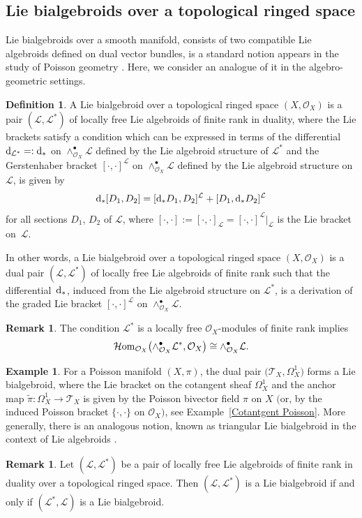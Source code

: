 \documentclass[pdftex]{sigma}
\numberwithin{equation}{section}
\theoremstyle{definition}
\newtheorem{Def}[Thm]{Definition}
\newtheorem{Exm}[Thm]{Example}
\newtheorem{Rem}[Thm]{Remark}
\begin{document}
\subsection{Lie bialgebroids over a topological ringed space} \label{Lie bialgebroids}
Lie bialgebroids over a smooth manifold, consists of two compatible Lie algebroids defined on dual vector bundles, is a standard notion appears in the study of Poisson geometry \cite{KS,KM,KM-PX,PX}.
Here, we consider an analogue of it in the algebro-geometric settings.
\begin{Def} A Lie bialgebroid over a topological ringed space $(X,\mathcal{O}_X)$ is a pair $(\mathcal{L}, \mathcal{L}^*)$ of locally free Lie algebroids of finite rank in duality, where the Lie brackets satisfy a condition which can be expressed in terms of the differential ${\rm d}_{\mathcal{L}^*}=:{\rm d}_*$ on $\wedge^\bullet_{\mathcal{O}_X} \mathcal{L}$ defined by the Lie algebroid structure of $\mathcal{L}^*$ and the Gerstenhaber bracket $[\cdot, \cdot]^{\mathcal{L}}$ on $\wedge^\bullet_{\mathcal{O}_X}\mathcal{L}$ defined by the Lie algebroid structure on $\mathcal{L}$, is given by
\[
{\rm d}_*[D_1, D_2]= [{\rm d}_*D_1, D_2]^{\mathcal{L}} + [D_1, {\rm d}_*D_2]^{\mathcal{L}}
\]
for all sections $D_1$, $D_2 $ of $\mathcal{L}$, where $[\cdot, \cdot]:=[\cdot, \cdot]_{\mathcal{L}}=[\cdot, \cdot]^{\mathcal{L}}|_{\mathcal{L}}$ is the Lie bracket on~$\mathcal{L}$.
	
In other words,	a Lie bialgebroid over a topological ringed space $(X,\mathcal{O}_X)$ is a dual pair $(\mathcal{L}, \mathcal{L}^*)$ of locally free Lie algebroids of finite rank such that the differential~${\rm d}_*$, induced from the Lie algebroid structure on $\mathcal{L}^*$, is a derivation of the graded Lie bracket $[\cdot, \cdot]^{\mathcal{L}}$ on $\wedge^\bullet_{\mathcal{O}_X}\mathcal{L}$.
\end{Def}
\begin{Rem}
	The condition $\mathcal{L}^*$ is a locally free $\mathcal{O}_X$-modules of finite rank implies
\[
\mathcal{H}{\rm om}_{\mathcal{O}_X}\bigl(\wedge^{\bullet}_{\mathcal{O}_X}\mathcal{L}^*, \mathcal{O}_X\bigr) \cong \wedge^{\bullet}_{\mathcal{O}_X}\mathcal{L}.
\]
\end{Rem}

\begin{Exm}
	For a Poisson manifold $(X, \pi)$, the dual pair $\bigl(\mathcal{T}_X, \Omega^1_X\bigr)$ forms a Lie bialgebroid, where the Lie bracket on the cotangent sheaf $\Omega^1_X$ and the anchor map $\tilde{\pi}\colon \Omega^1_X \rightarrow \mathcal{T}_X$ is given by the Poisson bivector field $\pi$ on $X$ $($or, by the induced Poisson bracket $\{\cdot, \cdot \}$ on $\mathcal{O}_X)$, see Example~\ref{Cotantgent Poisson}. More generally, there is an analogous notion, known as triangular Lie bialgebroid in the context of Lie algebroids \cite{KS}.
\end{Exm}
\begin{Rem}
	Let $(\mathcal{L}, \mathcal{L}^*)$ be a pair of locally free Lie algebroids of finite rank in duality over a topological ringed space. Then
	$(\mathcal{L}, \mathcal{L}^*)$ is a Lie bialgebroid if and only if $(\mathcal{L}^*, \mathcal{L})$ is a Lie bialgebroid.
\end{Rem}
\end{document}
